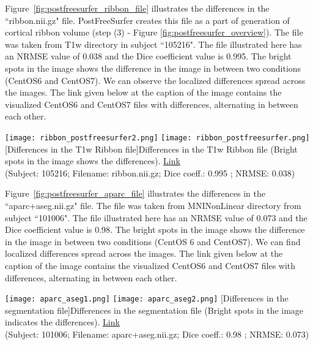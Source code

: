 Figure~\ref{fig:postfreesurfer_ribbon_file} illustrates the differences in the ``ribbon.nii.gz" file. PostFreeSurfer creates this file as a part of generation of cortical ribbon volume (step (3) - Figure \ref{fig:postfreesurfer_overview}). The file was taken from T1w directory in subject ``105216". The file illustrated here has an NRMSE value of 0.038 and the Dice coefficient value is 0.995. The bright spots in the image shows the difference in the image in between two conditions (CentOS6 and CentOS7). We can observe the localized differences spread across the images. The link given below at the caption of the image contains the visualized CentOS6 and CentOS7 files with differences, alternating in between each other.

\begin{center}
\texttt{[image: ribbon\_postfreesurfer2.png]}%
\texttt{[image: ribbon\_postfreesurfer.png]}
  [Differences in the T1w Ribbon file]{Differences in the T1w Ribbon file (Bright spots in the image shows the differences). \href{https://drive.google.com/file/d/1KGEvLP4bltu5k6m9tttoTuhehaH3ldGk/view?usp=sharing}{Link}\\(Subject: 105216; Filename: ribbon.nii.gz; Dice coeff.: 0.995 ; NRMSE: 0.038)}
\label{fig:postfreesurfer_ribbon_file}
\end{center}

Figure~\ref{fig:postfreesurfer_aparc_file} illustrates the differences in the ``aparc+aseg.nii.gz" file. The file was taken from MNINonLinear directory from subject ``101006". The file illustrated here has an NRMSE value of 0.073 and the Dice coefficient value is 0.98. The bright spots in the image shows the difference in the image in between two conditions (CentOS 6 and CentOS7). We can find localized differences spread across the images. The link given below at the caption of the image contains the visualized CentOS6 and CentOS7 files with differences, alternating in between each other.

\begin{center}
\texttt{[image: aparc\_aseg1.png]}%
\texttt{[image: aparc\_aseg2.png]}%
  [Differences in the segmentation file]{Differences in the segmentation file (Bright spots in the image indicates the differences). \href{https://drive.google.com/file/d/1_ZyAtveS1oVle8tAXeKsp1_4KdS2MVoB/view?usp=sharing}{Link}\\(Subject: 101006; Filename: aparc+aseg.nii.gz; Dice coeff.: 0.98 ; NRMSE: 0.073)}
\label{fig:postfreesurfer_aparc_file}
\end{center}

